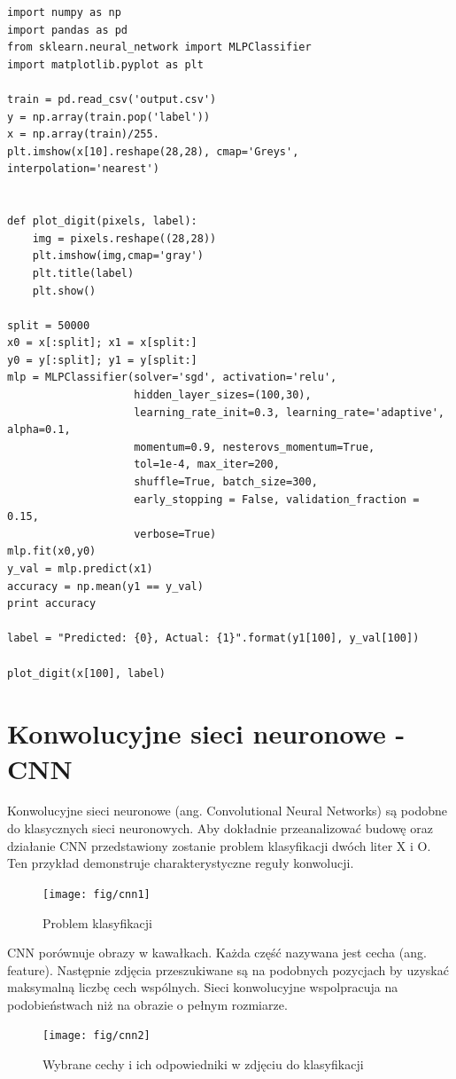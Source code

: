 \documentclass[brudnopis]{xmgr}
\begin{document}
\begin{lstlisting}
import numpy as np
import pandas as pd
from sklearn.neural_network import MLPClassifier
import matplotlib.pyplot as plt

train = pd.read_csv('output.csv')
y = np.array(train.pop('label'))
x = np.array(train)/255.
plt.imshow(x[10].reshape(28,28), cmap='Greys', interpolation='nearest')


def plot_digit(pixels, label):
    img = pixels.reshape((28,28))
    plt.imshow(img,cmap='gray')
    plt.title(label)
    plt.show()

split = 50000
x0 = x[:split]; x1 = x[split:]
y0 = y[:split]; y1 = y[split:]
mlp = MLPClassifier(solver='sgd', activation='relu',
                    hidden_layer_sizes=(100,30),
                    learning_rate_init=0.3, learning_rate='adaptive', alpha=0.1,
                    momentum=0.9, nesterovs_momentum=True,
                    tol=1e-4, max_iter=200,
                    shuffle=True, batch_size=300,
                    early_stopping = False, validation_fraction = 0.15,
                    verbose=True)
mlp.fit(x0,y0)
y_val = mlp.predict(x1)
accuracy = np.mean(y1 == y_val)
print accuracy

label = "Predicted: {0}, Actual: {1}".format(y1[100], y_val[100])

plot_digit(x[100], label)
\end{lstlisting}

\section{Konwolucyjne sieci neuronowe - CNN}

Konwolucyjne sieci neuronowe (ang. Convolutional Neural Networks) są podobne do klasycznych sieci neuronowych. Aby dokładnie przeanalizować budowę oraz działanie CNN przedstawiony zostanie problem klasyfikacji dwóch liter X i O. Ten przykład demonstruje charakterystyczne reguły konwolucji.

\begin{figure}[!tbh]
\centering
\texttt{[image: fig/cnn1]}
\caption{Problem klasyfikacji}
\end{figure}

CNN porównuje obrazy w kawałkach. Każda część nazywana jest cecha (ang. feature). Następnie zdjęcia przeszukiwane są na podobnych pozycjach by uzyskać maksymalną liczbę cech wspólnych. Sieci konwolucyjne wspolpracuja na podobieństwach niż na obrazie o pełnym rozmiarze.
\newpage

\begin{figure}[!tbh]
\centering
\texttt{[image: fig/cnn2]}
\caption{Wybrane cechy i ich odpowiedniki w zdjęciu do klasyfikacji}
\end{figure}
\end{document}
